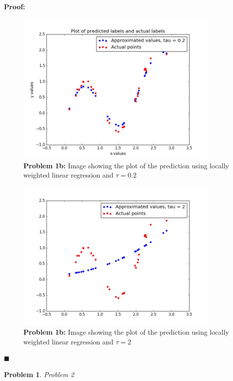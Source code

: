 \documentclass[12pt]{article}
\newenvironment{proof}{\paragraph{Proof: }}{\hfill$\blacksquare$}
\newtheorem{problem}{Problem}%
\begin{document}
\begin{proof}
\begin{enumerate}
\begin{figure}[!htbp]
\centering
\includegraphics[width=10cm]{hw2_p1_loc_weight_t1.jpg}
\caption{\textbf{Problem 1b:} Image showing the plot of the prediction using locally weighted linear regression and $\tau = 0.2$}
\end{figure}

\begin{figure}[!htbp]
\centering
\includegraphics[width=10cm]{hw2_p1_loc_weight_t2.jpg}
\caption{\textbf{Problem 1b:} Image showing the plot of the prediction using locally weighted linear regression and $\tau = 2$}
\end{figure}

\end{enumerate}
\end{proof}

\begin{problem}
\normalfont
Problem 2
\end{problem}
\end{document}
